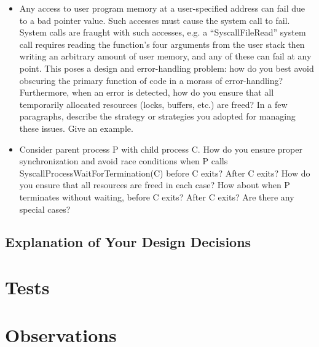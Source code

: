 \begin{enumerate}
\begin{itemize}
                \item Any access to user program memory at a user-specified address can fail due to a bad pointer value.  Such accesses must cause the system call to fail.  System calls are fraught with such accesses, e.g. a ``SyscallFileRead'' system call requires reading the function's four arguments from the user stack then writing an arbitrary amount of user memory, and any of these can fail at any point.  This poses a design and error-handling problem: how do you best avoid obscuring the primary function of code in a morass of error-handling?  Furthermore, when an error is detected, how do you ensure that all temporarily allocated resources (locks, buffers, etc.) are freed?  In a few paragraphs, describe the strategy or strategies you adopted for managing these issues. Give an example.
                
                
                \item Consider parent process P with child process C. How do you ensure proper synchronization and avoid race conditions when P calls SyscallProcessWaitForTermination(C) before C exits?  After C exits? How do you ensure that all resources are freed in each case? How about when P terminates without waiting, before C exits? After C exits? Are there any special cases?

            \end{itemize}

\end{enumerate}


\subsection{Explanation of Your Design Decisions}



\section{Tests}



\section{Observations}



